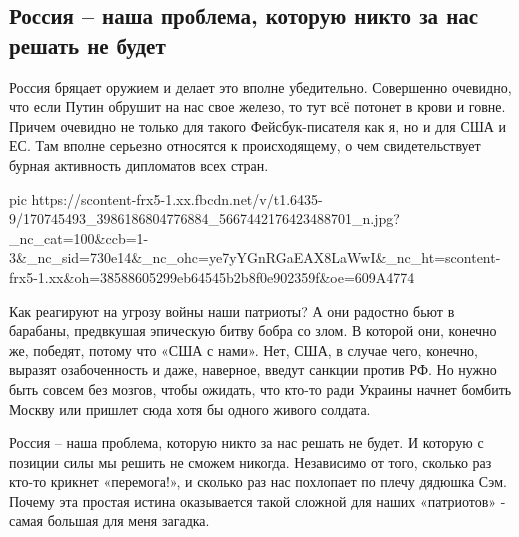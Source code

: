  
 
 
 
 

\subsection{Россия – наша проблема, которую никто за нас решать не будет}
\label{sec:09_04_2021.fb.chechilo_vyacheslav.1.rossia_ukraina_vojna_usa}

Россия бряцает оружием и делает это вполне убедительно. Совершенно очевидно,
что если Путин обрушит на нас свое железо, то тут всё потонет в крови и говне.
Причем очевидно не только для такого Фейсбук-писателя как я, но и для США и ЕС.
Там вполне серьезно относятся к происходящему, о чем свидетельствует бурная
активность дипломатов всех стран. 


\ifcmt
  pic https://scontent-frx5-1.xx.fbcdn.net/v/t1.6435-9/170745493_3986186804776884_5667442176423488701_n.jpg?_nc_cat=100&ccb=1-3&_nc_sid=730e14&_nc_ohc=ye7yYGnRGaEAX8LaWwI&_nc_ht=scontent-frx5-1.xx&oh=38588605299eb64545b2b8f0e902359f&oe=609A4774
\fi


Как реагируют на угрозу войны наши патриоты? А они радостно бьют в барабаны,
предвкушая эпическую битву бобра со злом. В которой они, конечно же, победят,
потому что «США с нами». Нет, США, в случае чего, конечно, выразят
озабоченность и даже, наверное, введут санкции против РФ. Но нужно быть совсем
без мозгов, чтобы ожидать, что кто-то ради Украины начнет бомбить Москву или
пришлет сюда хотя бы одного живого солдата. 

Россия – наша проблема, которую никто за нас решать не будет. И которую с
позиции силы мы решить не сможем никогда. Независимо от того, сколько раз
кто-то крикнет «перемога!», и сколько раз нас похлопает по плечу дядюшка Сэм.
Почему эта простая истина оказывается такой сложной для наших «патриотов» -
самая большая для меня загадка.
